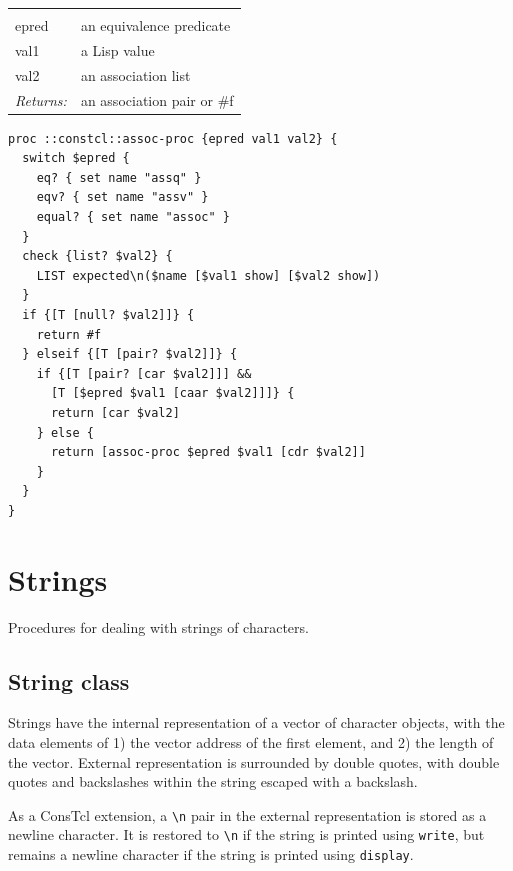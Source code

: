 \documentclass[twoside,9pt]{report}
\begin{document}
\noindent\begin{tabular}{ |p{1.9cm} p{8cm}| }
\hline
\rowcolor[HTML]{CCCCCC} \multicolumn{2}{|l|}{\bf assoc-proc (internal)} \\
epred & an equivalence predicate \\
val1 & a Lisp value \\
val2 & an association list \\
\textit{Returns:} & an association pair or \#f \\
\hline
\end{tabular}
\begin{lstlisting}
proc ::constcl::assoc-proc {epred val1 val2} {
  switch $epred {
    eq? { set name "assq" }
    eqv? { set name "assv" }
    equal? { set name "assoc" }
  }
  check {list? $val2} {
    LIST expected\n($name [$val1 show] [$val2 show])
  }
  if {[T [null? $val2]]} {
    return #f
  } elseif {[T [pair? $val2]]} {
    if {[T [pair? [car $val2]]] && 
      [T [$epred $val1 [caar $val2]]]} {
      return [car $val2]
    } else {
      return [assoc-proc $epred $val1 [cdr $val2]]
    }
  }
}
\end{lstlisting}
\section{Strings}
\label{strings}


Procedures for dealing with strings of characters.

\subsection{String class}
\label{string-class}


Strings have the internal representation of a vector of character objects, with the data elements of 1) the vector address of the first element, and 2) the length of the vector. External representation is surrounded by double quotes, with double quotes and backslashes within the string escaped with a backslash.


As a ConsTcl extension, a \texttt{\textbackslash n} pair in the external representation is stored as a newline character. It is restored to \texttt{\textbackslash n} if the string is printed using \texttt{write}, but remains a newline character if the string is printed using \texttt{display}.
\end{document}
